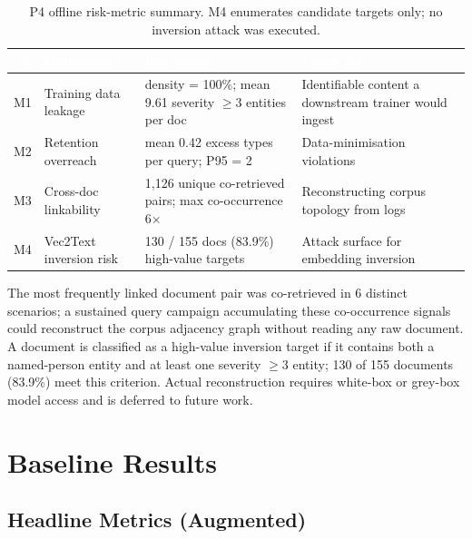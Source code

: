 \documentclass[11pt,a4paper]{article}
\newcommand{\hd}[1]{\textcolor{white}{\textbf{#1}}}   %
\begin{document}
\begin{table}[htbp]
\centering
{}
\begin{tabularx}{\textwidth}{@{} c l L L @{}}
\toprule
{}
\hd{\#} & \hd{Dimension} & \hd{Key values} & \hd{Proxy for} \\
\midrule
M1 & Training data leakage   & density = 100\%; mean 9.61 severity $\geq 3$ entities per doc & Identifiable content a downstream trainer would ingest \\
M2 & Retention overreach     & mean 0.42 excess types per query; P95 = 2 & Data-minimisation violations \\
M3 & Cross-doc linkability   & 1,126 unique co-retrieved pairs; max co-occurrence 6$\times$ & Reconstructing corpus topology from logs \\
M4 & Vec2Text inversion risk & 130 / 155 docs (83.9\%) high-value targets & Attack surface for embedding inversion \\
\bottomrule
\end{tabularx}
\caption{P4 offline risk-metric summary. M4 enumerates candidate targets only; no inversion attack was executed.}
\end{table}

The most frequently linked document pair was co-retrieved in 6 distinct scenarios; a sustained query campaign accumulating these co-occurrence signals could reconstruct the corpus adjacency graph without reading any raw document. A document is classified as a high-value inversion target if it contains both a named-person entity and at least one severity $\geq 3$ entity; 130 of 155 documents (83.9\%) meet this criterion. Actual reconstruction requires white-box or grey-box model access and is deferred to future work.

\section{Baseline Results}
\label{sec:results}

\subsection{Headline Metrics (Augmented)}
\end{document}
